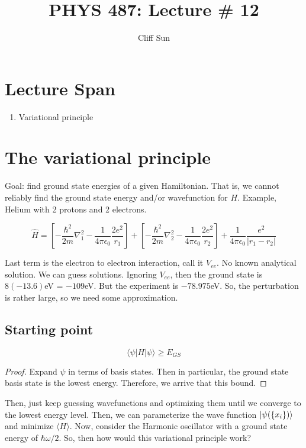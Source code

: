 \documentclass{article}
\title{PHYS 487: Lecture \# 12}
\author{Cliff Sun}
\newtheorem{one minute paper}[theorem]{One Minute Paper}
\begin{document}
\maketitle

\section*{Lecture Span}
\begin{enumerate}
    \item Variational principle
\end{enumerate}

\section*{The variational principle}

Goal: find ground state energies of a given Hamiltonian. That is, we cannot reliably find the ground state energy and/or wavefunction for $H$. Example, Helium with 2 protons and 2 electrons. 

\begin{equation}
    \hat{H} = \left[-\frac{\hbar^2}{2m}\nabla_1^2 - \frac{1}{4\pi \epsilon_0}\frac{2e^2}{r_1}\right] + \left[-\frac{\hbar^2}{2m}\nabla_2^2 - \frac{1}{4\pi \epsilon_0}\frac{2e^2}{r_2}\right] + \frac{1}{4\pi \epsilon_0}\frac{e^2}{|r_1 - r_2|}
\end{equation}

Last term is the electron to electron interaction, call it $V_{ee}$. No known analytical solution. We can guess solutions. Ignoring $V_{ee}$, then the ground state is $8(-13.6)$eV = $-109$eV. But the experiment is $-78.975$eV. So, the perturbation 
is rather large, so we need some approximation. 

\subsection*{Starting point}

\begin{equation}
    \langle \psi | H | \psi \rangle \geq E_{GS}
\end{equation}

\begin{proof}
    Expand $\psi$ in terms of basis states. Then in particular, the ground state basis state is the lowest energy. Therefore, we arrive that this bound. 
\end{proof}

Then, just keep guessing wavefunctions and optimizing them until we converge to the lowest energy level. Then, we can parameterize the wave function $\ket{\psi(\{x_i\})}$ and minimize $\langle H \rangle$. Now, consider the Harmonic oscillator with a ground state energy of $\hbar \omega/2$. So, then how would this variational principle work? 
\end{document}
